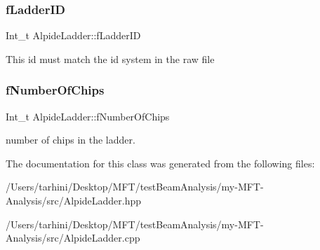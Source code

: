 \subsubsection{\texorpdfstring{f\+Ladder\+ID}{fLadderID}}
{\footnotesize\ttfamily Int\+\_\+t Alpide\+Ladder\+::f\+Ladder\+ID\hspace{0.3cm}{\ttfamily [private]}}

This id must match the id system in the raw file \mbox{\label{class_alpide_ladder_a90b3940b3c8b563115cc16efa27f4478}} 
\subsubsection{\texorpdfstring{f\+Number\+Of\+Chips}{fNumberOfChips}}
{\footnotesize\ttfamily Int\+\_\+t Alpide\+Ladder\+::f\+Number\+Of\+Chips\hspace{0.3cm}{\ttfamily [private]}}

number of chips in the ladder. 

The documentation for this class was generated from the following files\+:\begin{DoxyCompactItemize}
\item 
/\+Users/tarhini/\+Desktop/\+M\+F\+T/test\+Beam\+Analysis/my-\/\+M\+F\+T-\/\+Analysis/src/Alpide\+Ladder.\+hpp\item 
/\+Users/tarhini/\+Desktop/\+M\+F\+T/test\+Beam\+Analysis/my-\/\+M\+F\+T-\/\+Analysis/src/Alpide\+Ladder.\+cpp\end{DoxyCompactItemize}
